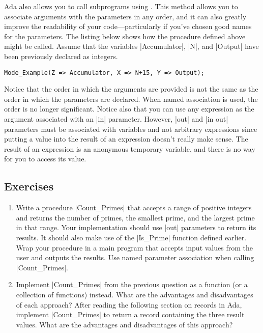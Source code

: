 Ada also allows you to call subprograms using . This
method allows you to associate arguments with the parameters in any order, and it can also
greatly improve the readability of your code---particularly if you've chosen good names for the
parameters. The listing below shows how the procedure defined above might be called. Assume that
the variables |Accumulator|, |N|, and |Output| have been previously declared as integers.

\begin{lstlisting}
Mode_Example(Z => Accumulator, X => N+15, Y => Output);
\end{lstlisting}

\noindent Notice that the order in which the arguments are provided is not the same as the order
in which the parameters are declared. When named association is used, the order is no longer
significant. Notice also that you can use any expression as the argument associated with an |in|
parameter. However, |out| and |in out| parameters must be associated with variables and not
arbitrary expressions since putting a value into the result of an expression doesn't really make
sense. The result of an expression is an anonymous temporary variable, and there is no way for
you to access its value.

\subsection*{Exercises}

\begin{enumerate}
\item Write a procedure |Count_Primes| that accepts a range of positive integers and returns the
  number of primes, the smallest prime, and the largest prime in that range. Your implementation
  should use |out| parameters to return its results. It should also make use of the |Is_Prime|
  function defined earlier. Wrap your procedure in a main program that accepts input values from
  the user and outputs the results. Use named parameter association when calling |Count_Primes|.

\item Implement |Count_Primes| from the previous question as a function (or a collection of
  functions) instead. What are the advantages and disadvantages of each approach? After reading
  the following section on records in Ada, implement |Count_Primes| to return a record
  containing the three result values. What are the advantages and disadvantages of this
  approach?
\end{enumerate}

